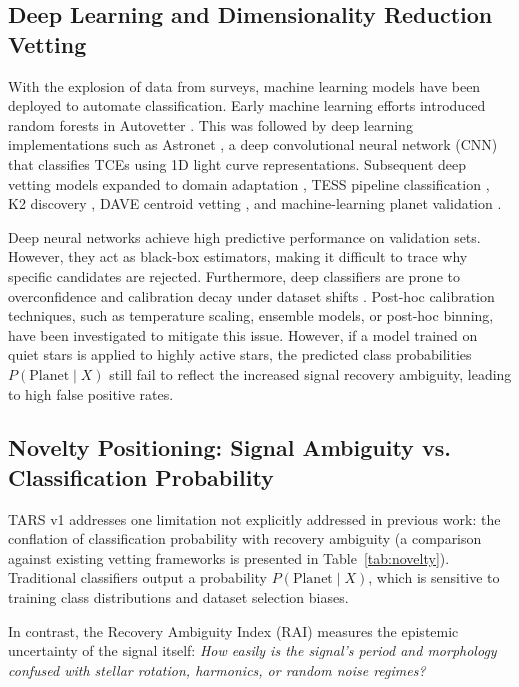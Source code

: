 \subsection{Deep Learning and Dimensionality Reduction Vetting} \label{sec:deep_learning_vetting}
With the explosion of data from surveys, machine learning models have been deployed to automate classification. Early machine learning efforts introduced random forests in Autovetter \citep{McCauliff2015}. This was followed by deep learning implementations such as Astronet \citep{Shallue2018}, a deep convolutional neural network (CNN) that classifies TCEs using 1D light curve representations. Subsequent deep vetting models expanded to domain adaptation \citep{Ansdell2018}, TESS pipeline classification \citep{Yu2019, Osborn2020, Olmschenk2021}, K2 discovery \citep{Dattilo2019}, DAVE centroid vetting \citep{Kostov2019}, and machine-learning planet validation \citep{Armstrong2021}.

Deep neural networks achieve high predictive performance on validation sets. However, they act as black-box estimators, making it difficult to trace why specific candidates are rejected. Furthermore, deep classifiers are prone to overconfidence and calibration decay under dataset shifts \citep{Guo2017, Niculescu2005}. Post-hoc calibration techniques, such as temperature scaling, ensemble models, or post-hoc binning, have been investigated to mitigate this issue. However, if a model trained on quiet stars is applied to highly active stars, the predicted class probabilities $P(\text{Planet} \mid X)$ still fail to reflect the increased signal recovery ambiguity, leading to high false positive rates.

\subsection{Novelty Positioning: Signal Ambiguity vs. Classification Probability} \label{sec:novelty_positioning}
TARS v1 addresses one limitation not explicitly addressed in previous work: the conflation of classification probability with recovery ambiguity (a comparison against existing vetting frameworks is presented in Table~\ref{tab:novelty}). Traditional classifiers output a probability $P(\text{Planet} \mid X)$, which is sensitive to training class distributions and dataset selection biases.

In contrast, the Recovery Ambiguity Index (RAI) measures the epistemic uncertainty of the signal itself: \textit{How easily is the signal's period and morphology confused with stellar rotation, harmonics, or random noise regimes?}

